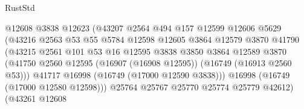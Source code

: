 \begin{lexlean}{RustStd}
\begin{coremodule}
                                        @12608
                                        @3838
                                        @12623
                                        (@43207
                                          @2564
                                          @494
                                          @157
                                          @12599
                                          @12606
                                          @5629
                                          (@43216
                                            @2563
                                            @53
                                            @55
                                            @5784
                                            @12598
                                            @12605
                                            @3864
                                            @12579
                                            @3870
                                            @41790
                                            (@43215
                                              @2561
                                              @101
                                              @53
                                              @16
                                              @12595
                                              @3838
                                              @3850
                                              @3864
                                              @12589
                                              @3870
                                              (@41750
                                                @2560
                                                @12595
                                                (@16907 (@16908 @12595))
                                                (@16749 (@16913 @2560 @53)))
                                              @41717
                                              @16998
                                              (@16749 (@17000 @12590 @3838)))
                                            @16998
                                            (@16749 (@17000 @12580 @12598)))
                                          @25764
                                          @25767
                                          @25770
                                          @25774
                                          @25779
                                          @42612)
                                        (@43261
                                          @12608

\end{coremodule}
\end{lexlean}
